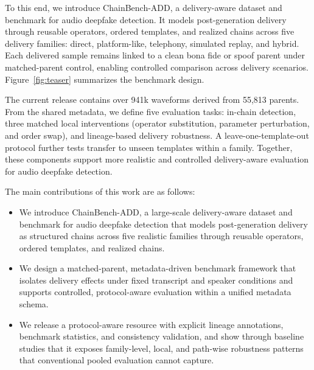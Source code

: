 To this end, we introduce ChainBench-ADD, a delivery-aware dataset and benchmark for audio deepfake detection. It models post-generation delivery through reusable operators, ordered templates, and realized chains across five delivery families: direct, platform-like, telephony, simulated replay, and hybrid. Each delivered sample remains linked to a clean bona fide or spoof parent under matched-parent control, enabling controlled comparison across delivery scenarios. Figure~\ref{fig:teaser} summarizes the benchmark design.

The current release contains over 941k waveforms derived from 55,813 parents. From the shared metadata, we define five evaluation tasks: in-chain detection, three matched local interventions (operator substitution, parameter perturbation, and order swap), and lineage-based delivery robustness. A leave-one-template-out protocol further tests transfer to unseen templates within a family. Together, these components support more realistic and controlled delivery-aware evaluation for audio deepfake detection.

The main contributions of this work are as follows:
\begin{itemize}
    \item We introduce ChainBench-ADD, a large-scale delivery-aware dataset and benchmark for audio deepfake detection that models post-generation delivery as structured chains across five realistic families through reusable operators, ordered templates, and realized chains.
    \item We design a matched-parent, metadata-driven benchmark framework that isolates delivery effects under fixed transcript and speaker conditions and supports controlled, protocol-aware evaluation within a unified metadata schema.
    \item We release a protocol-aware resource with explicit lineage annotations, benchmark statistics, and consistency validation, and show through baseline studies that it exposes family-level, local, and path-wise robustness patterns that conventional pooled evaluation cannot capture.
\end{itemize}